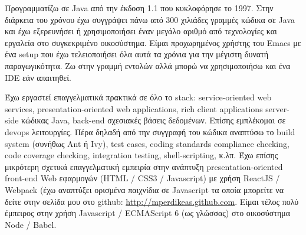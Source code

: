 \documentclass[10pt,a4paper]{article} %
\begin{document}
\begin{multicols}{2}  %
  \noindent
  Προγραμματίζω σε Java από την έκδοση 1.1 που κυκλοφόρησε το 1997. Στην διάρκεια του χρόνου έχω συγγράψει
  πάνω από 300 χιλιάδες γραμμές κώδικα σε Java και έχω εξερευνήσει ή χρησιμοποιήσει έναν μεγάλο αριθμό
  από τεχνολογίες και εργαλεία στο συγκεκριμένο οικοσύστημα.
  Είμαι προχωρημένος χρήστης του Emacs με ένα setup που έχω τελειοποιήσει όλα αυτά τα χρόνια
  για την μέγιστη δυνατή παραγωγικότητα. Ζω στην γραμμή εντολών αλλά μπορώ να χρησιμοποιήσω και ένα
  IDE εάν απαιτηθεί.

  Έχω εργαστεί επαγγελματικά πρακτικά σε όλο το stack: service-oriented web services, presentation-oriented
  web applications, rich client applications
  server-side κώδικας Java, back-end σχεσιακές βάσεις δεδομένων.
  Επίσης εμπλέκομαι σε devops λειτουργίες. Πέρα δηλαδή από την συγγραφή του κώδικα αναπτύσω το build
  system (συνήθως Ant ή Ivy), test cases, coding standards compliance checking, code coverage checking,
  integration testing, shell-scripting, κ.λπ.
  Έχω επίσης μικρότερη σχετικά επαγγελματική εμπειρία στην ανάπτυξη presentation-oriented front-end Web
  εφαρμογών (HTML / CSS3 / Javascript) με χρήση ReactJS / Webpack (έχω αναπτύξει ορισμένα παιχνίδια σε Javascript
  τα οποία μπορείτε να δείτε στην σελίδα μου στο github: \href{http://mperdikeas.github.com}{http://mperdikeas.github.com}.
  Είμαι τέλος πολύ έμπειρος στην χρήση Javascript / ECMAScript 6 (ως γλώσσας) στο οικοσύστημα Node / Babel.


\end{multicols}

\spacedhrule{0.5em}{-0.4em} %


\end{document}
